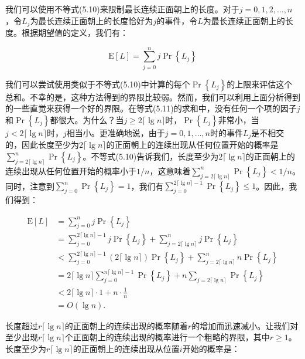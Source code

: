\documentclass[lang=cn,newtx,10pt,scheme=chinese]{elegantbook}
\begin{document}
我们可以使用不等式(5.10)来限制最长连续正面朝上的长度。对于$j=0,1,2,\ldots,n$，令$L_j$为最长连续正面朝上的长度恰好为$j$的事件，令$L$为最长连续正面朝上的长度。根据期望值的定义，我们有：

$$
\mathrm{E}[L]=\sum_{j=0}^n j \operatorname{Pr}\left\{L_j\right\}
$$

我们可以尝试使用类似于不等式(5.10)中计算的每个$\operatorname{Pr}\left\{L_j\right\}$的上限来评估这个总和。不幸的是，这种方法得到的界限比较弱。然而，我们可以利用上面分析得到的一些直觉来获得一个好的界限。在等式(5.11)的求和中，没有任何一个项的因子$j$和$\operatorname{Pr}\left\{L_j\right\}$都很大。为什么？当$j\geq 2\lceil\lg n\rceil$时，$\operatorname{Pr}\left\{L_j\right\}$非常小，当$j<2\lceil\lg n\rceil$时，$j$相当小。更准确地说，由于$j=0,1,\ldots,n$时的事件$L_j$是不相交的，因此长度至少为$2\lceil\lg n\rceil$的正面朝上的连续出现从任何位置开始的概率是$\sum_{j=2\lceil\lg n\rceil}^n \operatorname{Pr}\left\{L_j\right\}$。不等式(5.10)告诉我们，长度至少为$2\lceil\lg n\rceil$的正面朝上的连续出现从任何位置开始的概率小于$1/n$，这意味着$\sum_{j=2\lceil\lg n\rceil}^n \operatorname{Pr}\left\{L_j\right\}<1/n$。同时，注意到$\sum_{j=0}^n \operatorname{Pr}\left\{L_j\right\}=1$，我们有$\sum_{j=0}^{2\lceil\lg n\rceil-1} \operatorname{Pr}\left\{L_j\right\} \leq 1$。因此，我们得到：

$$
\begin{aligned}
\mathrm{E}[L] & =\sum_{j=0}^n j \operatorname{Pr}\left\{L_j\right\} \\
& =\sum_{j=0}^{2\lceil\lg n\rceil-1} j \operatorname{Pr}\left\{L_j\right\}+\sum_{j=2\lceil\lg n\rceil}^n j \operatorname{Pr}\left\{L_j\right\} \\
& <\sum_{j=0}^{2\lceil\lg n\rceil-1}(2\lceil\lg n\rceil) \operatorname{Pr}\left\{L_j\right\}+\sum_{j=2\lceil\lg n\rceil}^n n \operatorname{Pr}\left\{L_j\right\} \\
& =2\lceil\lg n\rceil \sum_{j=0}^{n\lceil\lg n\rceil-1} \operatorname{Pr}\left\{L_j\right\}+n \sum_{j=2\lceil\lg n\rceil} \operatorname{Pr}\left\{L_j\right\} \\
& <2\lceil\lg n\rceil \cdot 1+n \cdot \frac{1}{n} \\
& =O(\lg n) .
\end{aligned}
$$

长度超过$r\lceil\lg n\rceil$的正面朝上的连续出现的概率随着$r$的增加而迅速减小。让我们对至少出现$r\lceil\lg n\rceil$个正面朝上的连续出现的概率进行一个粗略的界限，其中$r\geq 1$。长度至少为$r\lceil\lg n\rceil$的正面朝上的连续出现从位置$i$开始的概率是：
\end{document}

